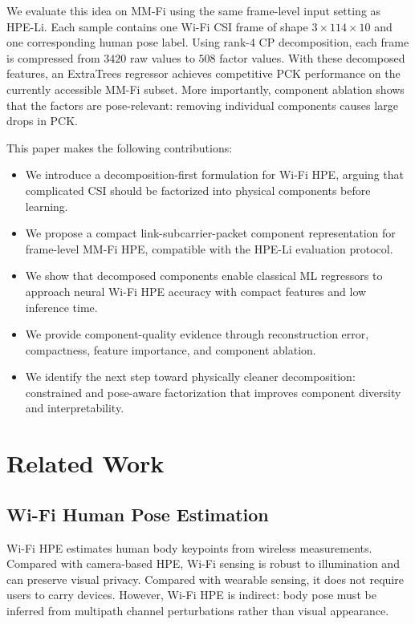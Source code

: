 \documentclass[letterpaper]{article}
\begin{document}
We evaluate this idea on MM-Fi using the same frame-level input setting as HPE-Li. Each sample contains one Wi-Fi CSI frame of shape $3 \times 114 \times 10$ and one corresponding human pose label. Using rank-4 CP decomposition, each frame is compressed from $3420$ raw values to $508$ factor values. With these decomposed features, an ExtraTrees regressor achieves competitive PCK performance on the currently accessible MM-Fi subset. More importantly, component ablation shows that the factors are pose-relevant: removing individual components causes large drops in PCK.

This paper makes the following contributions:
\begin{itemize}
    \item We introduce a decomposition-first formulation for Wi-Fi HPE, arguing that complicated CSI should be factorized into physical components before learning.
    \item We propose a compact link-subcarrier-packet component representation for frame-level MM-Fi HPE, compatible with the HPE-Li evaluation protocol.
    \item We show that decomposed components enable classical ML regressors to approach neural Wi-Fi HPE accuracy with compact features and low inference time.
    \item We provide component-quality evidence through reconstruction error, compactness, feature importance, and component ablation.
    \item We identify the next step toward physically cleaner decomposition: constrained and pose-aware factorization that improves component diversity and interpretability.
\end{itemize}

\section{Related Work}

\subsection{Wi-Fi Human Pose Estimation}

Wi-Fi HPE estimates human body keypoints from wireless measurements. Compared with camera-based HPE, Wi-Fi sensing is robust to illumination and can preserve visual privacy. Compared with wearable sensing, it does not require users to carry devices. However, Wi-Fi HPE is indirect: body pose must be inferred from multipath channel perturbations rather than visual appearance.
\end{document}
